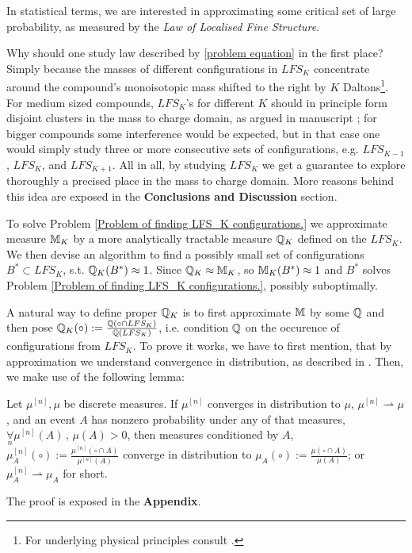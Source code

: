 In statistical terms, we are interested in approximating some critical set of large probability, as measured by the {\it Law of Localised Fine Structure}. 


Why should one study law described by \eqref{problem equation} in the first place? Simply because the masses of different configurations in $LFS_K$ concentrate around the compound's monoisotopic mass shifted to the right by $K$ Daltons\footnote{For underlying physical principles consult \cite{Hughey2001KendrickMassDefect}.}. For medium sized compounds, $LFS_K$'s for different $K$ should in principle form disjoint clusters in the mass to charge domain, as argued in manuscript \cite{Dittwald2014OnTheFineIsotopicDistribution}; for bigger compounds some interference would be expected, but in that case one would simply study three or more consecutive sets of configurations, e.g. $LFS_{K-1}$, $LFS_K$, and $LFS_{K+1}$. All in all, by studying $LFS_K$ we get a guarantee to explore thoroughly a precised place in the mass to charge domain. More reasons behind this idea are exposed in the \textbf{Conclusions and Discussion} section. 


To solve Problem \ref{Problem of finding LFS_K configurations.} we approximate measure $\mathbb{M}_K$ by a more analytically tractable measure $\mathbb{Q}_K$ defined on the $LFS_K$. We then devise an algorithm to find a possibly small set of configurations $B^* \subset LFS_K$, s.t. $\mathbb{Q}_K (B^*) \approx 1$. Since $\mathbb{Q}_K \approx \mathbb{M}_K$, so $\mathbb{M}_K (B^*) \approx 1$ and $B^*$ solves Problem \ref{Problem of finding LFS_K configurations.}, possibly suboptimally.


A natural way to define proper $\mathbb{Q}_K$ is to first approximate $\mathbb{M}$ by some $\mathbb{Q}$ and then pose $\mathbb{Q}_K (\circ) := \frac{\mathbb{Q} (\circ \cap LFS_K) }{\mathbb{Q}(LFS_K)}$, i.e. condition $\mathbb{Q}$ on the occurence of configurations from $LFS_K$. To prove it works, we have to first mention, that by approximation we understand convergence in distribution, as described in \cite{Kallenberg2002FoundationsOfModernProbability}. Then, we make use of the following lemma: 

\begin{lemma}\label{conditional convergence lemma}
	Let $\mu^{[n]}, \mu$ be discrete measures. If $\mu^{[n]}$ converges in distribution to $\mu$, $\mu^{[n]} \rightharpoonup  \mu$, and an event $A$ has nonzero probability under any of that measures, $\underset{n}{\forall} \mu^{[n]}(A)\,,\, \mu(A) > 0$, then measures conditioned by $A$, $\mu^{[n]}_A (\circ) := \frac{\mu^{[n]} ( \circ \cap A)}{\mu^{[n]}(A)}$ converge in distribution to $\mu_A (\circ) := \frac{ \mu( \circ \cap A) }{ \mu(A) }$; or $\mu^{[n]}_A \rightharpoonup \mu_A$ for short.
\end{lemma}  
The proof is exposed in the \textbf{Appendix}.  


